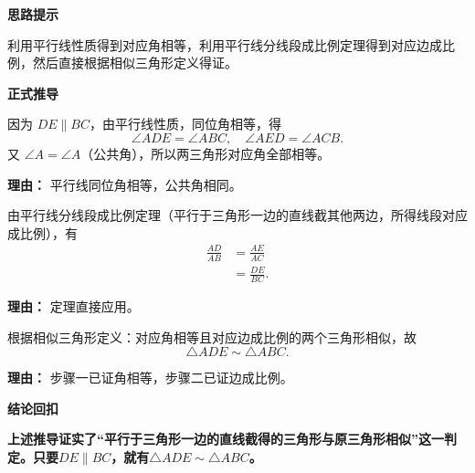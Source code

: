 \begin{proofbox}
	\textbf{\textcolor{CProof}{思路提示}}

	利用平行线性质得到对应角相等，利用平行线分线段成比例定理得到对应边成比例，然后直接根据相似三角形定义得证。

	\medskip
	\textbf{\textcolor{CProof}{正式推导}}
	\begin{description}[style=nextline, leftmargin=2.8em, labelsep=0.5em, itemsep=0.55em]
		\item[\textbf{步骤一（找等角）：}] 因为 $DE\parallel BC$，由平行线性质，同位角相等，得
			\[
				\angle ADE = \angle ABC,\quad \angle AED = \angle ACB.
			\]
			又 $\angle A = \angle A$（公共角），所以两三角形对应角全部相等。
			\par\textbf{理由：} 平行线同位角相等，公共角相同。

		\item[\textbf{步骤二（比例关系）：}] 由平行线分线段成比例定理（平行于三角形一边的直线截其他两边，所得线段对应成比例），有
			\[
				\begin{aligned}
					\frac{AD}{AB} &= \frac{AE}{AC} \\
					&= \frac{DE}{BC}.
			\end{aligned}
			\]
			\par\textbf{理由：} 定理直接应用。

		\item[\textbf{步骤三（定义证相似）：}] 根据相似三角形定义：对应角相等且对应边成比例的两个三角形相似，故
			\[
				\triangle ADE \sim \triangle ABC.
			\]
			\par\textbf{理由：} 步骤一已证角相等，步骤二已证边成比例。
	\end{description}

	\medskip
	\textbf{\textcolor{CProof}{结论回扣}}

	\textbf{上述推导证实了“平行于三角形一边的直线截得的三角形与原三角形相似”这一判定。只要$DE\parallel BC$，就有$\triangle ADE\sim\triangle ABC$。}
\end{proofbox}
